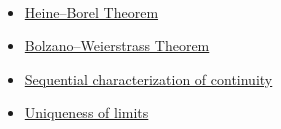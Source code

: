 \begin{remark*}[Dependencies]~\\
\begin{itemize}
  \item \hyperref[thm:heine-borel]{Heine--Borel Theorem}
  \item \hyperref[thm:bolzano-weierstrass]{Bolzano--Weierstrass Theorem}
  \item \hyperref[thm:continuity-three-equiv]{Sequential characterization of continuity}
  \item \hyperref[thm:uniqueness-of-limits]{Uniqueness of limits}
\end{itemize}
\end{remark*}
